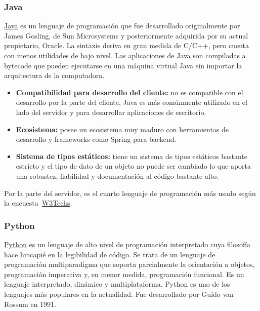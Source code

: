 \subsubsection{Java}

\href{https://es.wikipedia.org/w/index.php?title=Java_(lenguaje_de_programaci%C3%B3n)&oldid=161108422}{Java} es un lenguaje de programación que fue desarrollado originalmente por James Gosling, de Sun Microsystems y posteriormente adquirida por su actual propietario, Oracle. La sintaxis deriva en gran medida de C/C++, pero cuenta con menos utilidades de bajo nivel. Las aplicaciones de Java son compiladas a bytecode que pueden ejecutarse en una máquina virtual Java sin importar la arquitectura de la computadora.

\begin{itemize}
    \item[\mal] \textbf{Compatibilidad para desarrollo del cliente:} no es compatible con el desarrollo por la parte del cliente, Java es más comúnmente utilizado en el lado del servidor y para desarrollar aplicaciones de escritorio.
    \item[\bien] \textbf{Ecosistema:} posee un ecosistema muy maduro con herramientas de desarrollo y frameworks como Spring para backend.
    \item[\esp] \textbf{Sistema de tipos estáticos:} tiene un sistema de tipos estáticos bastante estricto y el tipo de dato de un objeto no puede ser cambiado lo que aporta una robustez, fiabilidad y documentación al código bastante alto.
\end{itemize}

Por la parte del servidor, es el cuarto lenguaje de programación más usado según la encuesta~\href{https://w3techs.com/technologies/overview/programming_language}{W3Techs}.

\subsubsection{Python}

\href{https://es.wikipedia.org/w/index.php?title=Python&oldid=161467974}{Python} es un lenguaje de alto nivel de programación interpretado cuya filosofía hace hincapié en la legibilidad de código. Se trata de un lenguaje de programación multiparadigma que soporta parcialmente la orientación a objetos, programación imperativa y, en menor medida, programación funcional. Es un lenguaje interpretado, dinámico y multiplataforma. Python es uno de los lenguajes más populares en la actualidad. Fue desarrollado por Guido van Rossum en 1991.

